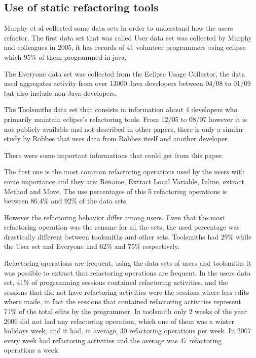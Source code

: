 \subsection{Use of static refactoring tools}

Murphy et al \cite{murphy2012we} collected some data sets in order to understand how the users refactor.
The first data set that was called User data set was collected by Murphy and colleagues \cite{murphy2006java} in 2005, it has records of 41 volunteer programmers using eclipse which 95\% of them programmed in java. %

The Everyone data set was collected from the Eclipse Usage Collector, the data used aggregates activity from over 13000 Java developers between 04/08 to 01/09 but also include non-Java developers.

The Toolsmiths data set that consists in information about 4 developers who primarily maintain eclipse's refactoring tools. From 12/05 to 08/07 however it is not publicly available and not described in other papers, there is only a similar study by Robbes \cite{robbes2007mining} that uses data from Robbes itself and another developer. 


There were some important informations that could get from this paper.

The first one is the most common refactoring operations used by the users with some importance and they are: Rename, Extract Local Variable, Inline, extract Method and Move. The use percentages of this 5 refactoring operations is between 86.4\% and 92\% of the data sets. %

However the refactoring behavior differ among users. Even that the most refactoring operation was the rename for all the sets, the used percentage was drastically different between toolsmiths and other sets. Toolsmiths had 29\% while the User set and Everyone had 62\% and 75\% respectively.

Refactoring operations are frequent, using the data sets of users and toolsmiths it was possible to extract that refactoring operations are frequent. In the users data set, 41\% of programming sessions contained refactoring activities, and the sessions that did not have refactoring activities were the sessions where less edits where made, in fact the sessions that contained refactoring activities represent 71\% of the total edits by the programmer.
In toolsmith only 2 weeks of the year 2006 did not had any refactoring operation, which one of them was a winter holidays week, and it had, in average, 30 refactoring operations per week. In 2007 every week had refactoring activities and the average was 47 refactoring operations a week.

